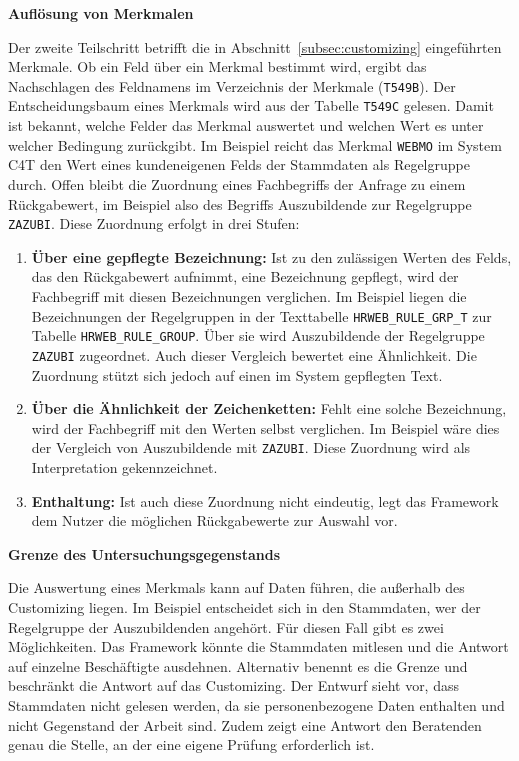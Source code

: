 \textbf{Auflösung von Merkmalen}

Der zweite Teilschritt betrifft die in Abschnitt~\ref{subsec:customizing} eingeführten Merkmale. Ob ein Feld über ein Merkmal bestimmt wird, ergibt das Nachschlagen des Feldnamens im Verzeichnis der Merkmale (\texttt{T549B}). Der Entscheidungsbaum eines Merkmals wird aus der Tabelle \texttt{T549C} gelesen. Damit ist bekannt, welche Felder das Merkmal auswertet und welchen Wert es unter welcher Bedingung zurückgibt. Im Beispiel reicht das Merkmal \texttt{WEBMO} im System C4T den Wert eines kundeneigenen Felds der Stammdaten als Regelgruppe durch. Offen bleibt die Zuordnung eines Fachbegriffs der Anfrage zu einem Rückgabewert, im Beispiel also des Begriffs \glqq Auszubildende\grqq{} zur Regelgruppe \texttt{ZAZUBI}. Diese Zuordnung erfolgt in drei Stufen:
\begin{enumerate}
	\item \textbf{Über eine gepflegte Bezeichnung:} Ist zu den zulässigen Werten des Felds, das den Rückgabewert aufnimmt, eine Bezeichnung gepflegt, wird der Fachbegriff mit diesen Bezeichnungen verglichen. Im Beispiel liegen die Bezeichnungen der Regelgruppen in der Texttabelle \texttt{HRWEB\_RULE\_GRP\_T} zur Tabelle \texttt{HRWEB\_RULE\_GROUP}. Über sie wird \glqq Auszubildende\grqq{} der Regelgruppe \texttt{ZAZUBI} zugeordnet. Auch dieser Vergleich bewertet eine Ähnlichkeit. Die Zuordnung stützt sich jedoch auf einen im System gepflegten Text.
	\item \textbf{Über die Ähnlichkeit der Zeichenketten:} Fehlt eine solche Bezeichnung, wird der Fachbegriff mit den Werten selbst verglichen. Im Beispiel wäre dies der Vergleich von \glqq Auszubildende\grqq{} mit \texttt{ZAZUBI}. Diese Zuordnung wird als Interpretation gekennzeichnet.
	\item \textbf{Enthaltung:} Ist auch diese Zuordnung nicht eindeutig, legt das Framework dem Nutzer die möglichen Rückgabewerte zur Auswahl vor.
\end{enumerate}

\textbf{Grenze des Untersuchungsgegenstands}

Die Auswertung eines Merkmals kann auf Daten führen, die außerhalb des Customizing liegen. Im Beispiel entscheidet sich in den Stammdaten, wer der Regelgruppe der Auszubildenden angehört. Für diesen Fall gibt es zwei Möglichkeiten. Das Framework könnte die Stammdaten mitlesen und die Antwort auf einzelne Beschäftigte ausdehnen. Alternativ benennt es die Grenze und beschränkt die Antwort auf das Customizing. Der Entwurf sieht vor, dass Stammdaten nicht gelesen werden, da sie personenbezogene Daten enthalten und nicht Gegenstand der Arbeit sind. Zudem zeigt eine Antwort den Beratenden genau die Stelle, an der eine eigene Prüfung erforderlich ist.

